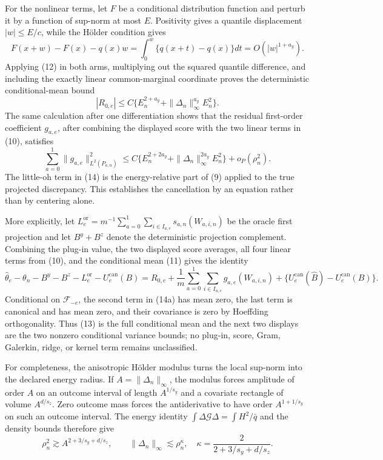 For the nonlinear terms, let \(F\) be a conditional distribution function and perturb it by a function of sup-norm at most \(E\). Positivity gives a quantile displacement \(|w|\le E/c\), while the H\"older condition gives
\[
F(x+w)-F(x)-q(x)w=\int_0^w\{q(x+t)-q(x)\}dt=O(|w|^{1+a_y}).          \tag{12}
\]
Applying (12) in both arms, multiplying out the squared quantile difference, and including the exactly linear common-marginal coordinate proves the deterministic conditional-mean bound
\[
|R_{0,e}|
\le C\{E_n^{2+a_y}+\|\Delta_n\|_\infty^{a_y}E_n^2\}.                \tag{13}
\]
The same calculation after one differentiation shows that the residual first-order coefficient \(g_{a,e}\), after combining the displayed score with the two linear terms in (10), satisfies
\[
\sum_{a=0}^1\|g_{a,e}\|_{L^2(P_{a,n})}^2
\le C\{E_n^{2+2a_y}+\|\Delta_n\|_\infty^{2a_y}E_n^2\}+o_P(\rho_n^2). \tag{14}
\]
The little-oh term in (14) is the energy-relative part of (9) applied to the true projected discrepancy. This establishes the cancellation by an equation rather than by centering alone.

More explicitly, let \(L_e^{\mathrm{or}}=m^{-1}\sum_{a=0}^1\sum_{i\in I_{a,e}}s_{a,n}(W_{a,i,n})\) be the oracle first projection and let \(B^y+B^z\) denote the deterministic projection complement. Combining the plug-in value, the two displayed score averages, all four linear terms from (10), and the conditional mean (11) gives the identity
\[
\widehat\theta_e-\theta_n-B^y-B^z-L_e^{\mathrm{or}}-U_e^{\mathrm{can}}(B)
=R_{0,e}
+\frac1m\sum_{a=0}^1\sum_{i\in I_{a,e}}g_{a,e}(W_{a,i,n})
+\{U_e^{\mathrm{can}}(\widehat B)-U_e^{\mathrm{can}}(B)\}.             \tag{14a}
\]
Conditional on \(\mathscr F_{-e}\), the second term in (14a) has mean zero, the last term is canonical and has mean zero, and their covariance is zero by Hoeffding orthogonality. Thus (13) is the full conditional mean and the next two displays are the two nonzero conditional variance bounds; no plug-in, score, Gram, Galerkin, ridge, or kernel term remains unclassified.

For completeness, the anisotropic H\"older modulus turns the local sup-norm into the declared energy radius. If \(A=\|\Delta_n\|_\infty\), the modulus forces amplitude of order \(A\) on an outcome interval of length \(A^{1/s_y}\) and a covariate rectangle of volume \(A^{d/s_z}\). Zero outcome mass forces the antiderivative to have order \(A^{1+1/s_y}\) on such an outcome interval. The energy identity \(\int\Delta\mathcal G\Delta=\int H^2/\bar q\) and the density bounds therefore give
\[
\rho_n^2\gtrsim A^{2+3/s_y+d/s_z},
\qquad \|\Delta_n\|_\infty\lesssim\rho_n^\kappa,
\quad \kappa=\frac{2}{2+3/s_y+d/s_z}.                                \tag{15}
\]

